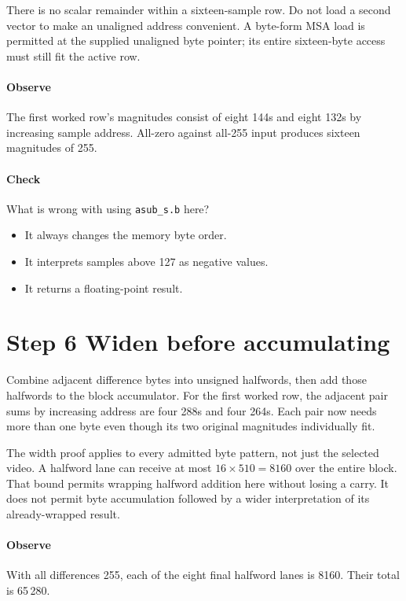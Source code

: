 There is no scalar remainder within a sixteen-sample row. Do not load a second
vector to make an unaligned address convenient. A byte-form MSA load is permitted
at the supplied unaligned byte pointer; its entire sixteen-byte access must still
fit the active row.

\paragraph{Observe} The first worked row's magnitudes consist of eight 144s and
eight 132s by increasing sample address. All-zero against all-255 input produces
sixteen magnitudes of 255.
\paragraph{Check} What is wrong with using \texttt{asub\_s.b} here?
\begin{itemize}
  \item[A.] It always changes the memory byte order.
  \item[B.] It interprets samples above 127 as negative values.
  \item[C.] It returns a floating-point result.
\end{itemize}

\section{Step 6 Widen before accumulating}\label{h263-sad-s06}
Combine adjacent difference bytes into unsigned halfwords, then add those
halfwords to the block accumulator. For the first worked row, the adjacent pair
sums by increasing address are four 288s and four 264s. Each pair now needs more
than one byte even though its two original magnitudes individually fit.

The width proof applies to every admitted byte pattern, not just the selected
video. A halfword lane can receive at most $16\times510=8160$ over the entire
block. That bound permits wrapping halfword addition here without losing a carry.
It does not permit byte accumulation followed by a wider interpretation of its
already-wrapped result.

\paragraph{Observe} With all differences 255, each of the eight final halfword
lanes is 8160. Their total is 65\,280.
